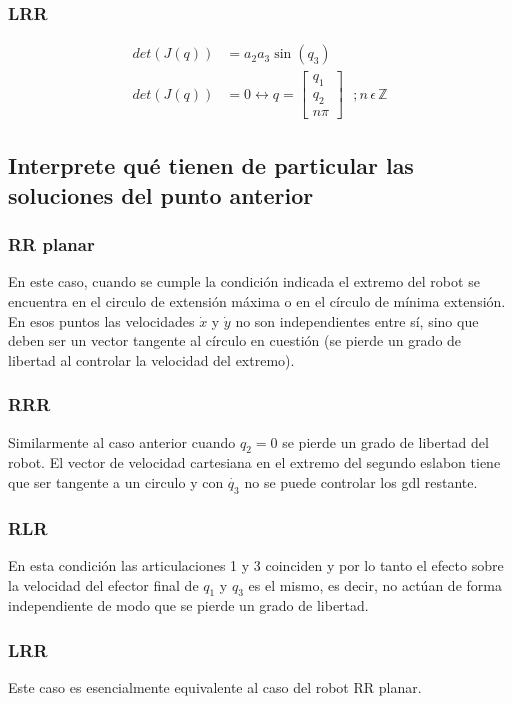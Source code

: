 \documentclass[a4paper,12pt]{article}
\begin{document}
\subsubsection{LRR}
\begin{align*}
    det(J(q)) &= a_2a_3\sin(q_3)\\
    det(J(q)) &= 0 \leftrightarrow
    q = 
    \begin{bmatrix}
        q_1\\
        q_2\\
        n\pi
    \end{bmatrix}
    \,\,\,\,;n\,\epsilon\,\mathbb{Z}
\end{align*}

\subsection{Interprete qué tienen de particular las soluciones del punto anterior}
\subsubsection{RR planar}
En este caso, cuando se cumple la condición indicada el extremo del robot se encuentra en el circulo de extensión
máxima o en el círculo de mínima extensión. En esos puntos las velocidades $\dot{x}$ y $\dot{y}$ no son independientes
entre sí, sino que deben ser un vector tangente al círculo en cuestión (se pierde un grado de libertad al controlar la velocidad del extremo).

\subsubsection{RRR}
Similarmente al caso anterior cuando $q_2 = 0$ se pierde un grado de libertad del robot.
El vector de velocidad cartesiana en el extremo del segundo eslabon tiene que ser tangente a un circulo
y con $\dot{q_3}$ no se puede controlar los gdl restante.

\subsubsection{RLR}
En esta condición las articulaciones 1 y 3 coinciden y por lo tanto el efecto sobre la velocidad
del efector final de $q_1$ y $q_3$ es el mismo, es decir, no actúan de forma independiente de modo que se pierde un grado de libertad.

\subsubsection{LRR}
Este caso es esencialmente equivalente al caso del robot RR planar.
\end{document}
